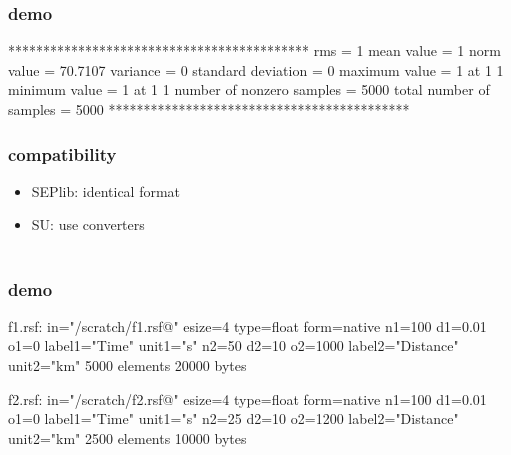 \begin{frame}[fragile] \frametitle{demo}


\tiny
\begin{semiverbatim}
*******************************************
rms = 1
mean value = 1
norm value = 70.7107
variance = 0
standard deviation = 0
maximum value = 1 at 1 1
minimum value = 1 at 1 1
number of nonzero samples = 5000
total number of samples = 5000
*******************************************
\end{semiverbatim}

\end{frame}
\cwpnote{}

\begin{frame} \frametitle{compatibility}

  \begin{itemize}
  \item SEPlib: identical format
    \\
  \item SU: use converters
    \\
    \vspace{0.25in}
    \\
  \end{itemize}

\end{frame}
\cwpnote{}

\begin{frame}[fragile] \frametitle{demo}


  \vfill

\tiny
\begin{semiverbatim}
f1.rsf:
    in="/scratch/f1.rsf@"
    esize=4 type=float form=native
    n1=100         d1=0.01        o1=0          label1="Time" unit1="s"
    n2=50          d2=10          o2=1000       label2="Distance" unit2="km"
        5000 elements 20000 bytes
\end{semiverbatim}
\large

  \vfill

\tiny
\begin{semiverbatim}
f2.rsf:
    in="/scratch/f2.rsf@"
    esize=4 type=float form=native
    n1=100         d1=0.01        o1=0          label1="Time" unit1="s"
    n2=25          d2=10          o2=1200       label2="Distance" unit2="km"
        2500 elements 10000 bytes
\end{semiverbatim}
\end{frame}
\cwpnote{}


